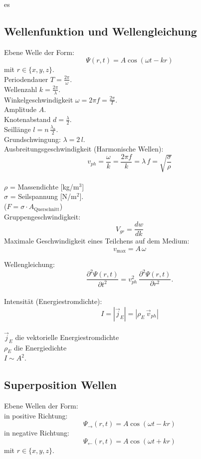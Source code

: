 es\documentclass[a4paper, fontsize=8pt, landscape]{scrartcl}
\begin{document}
\begin{multicols*}{4}
\subsection{Wellenfunktion und Wellengleichung}
    Ebene Welle der Form:
    \[\Psi(r,t) = A \cos(\omega t - k r)\]
    mit \(r \in \{x,y,z\}\).\\
    
    Periodendauer \(T = \frac{2\pi}{\omega}\).\\
    Wellenzahl \(k = \frac{2\pi}{\lambda}\).\\
    Winkelgeschwindigkeit \(\omega = 2\pi f = \frac{2\pi}{T}\).\\
    Amplitude \(A\).\\
    Knotenabstand \(d = \frac{\lambda}{2}\).\\
    Seillänge \(l = n\,\frac{\lambda_n}{2}\).\\
    Grundschwingung: \(\lambda = 2\,l\).\\



    Ausbreitungsgeschwindigkeit (Harmonische Wellen):
    \[v_{ph} =  \frac{\omega}{k} = \frac{2\pi f}{k} = \lambda\,f = \sqrt{\frac{\sigma}{\rho}}\]\\
    \(\rho\) = Massendichte [kg/m\(^3\)]\\
    \(\sigma\) = Seilspannung [N/m\(^2\)].\\
    ($F = \sigma \cdot A_{\text{Querschnitt}}$)\\
    Gruppengeschwindigkeit:
    \[V_{gr} = \frac{dw}{dk}\]
    Maximale Geschwindigkeit eines Teilchens auf dem Medium:
    \[v_{\text{max}} = A\,\omega\]


    Wellengleichung:
    \[\frac{\partial^2 \Psi(r,t)}{\partial t^2} = v_{ph}^2 \,\frac{\partial^2 \Psi(r,t)}{\partial r^2}.\]
    \\
    Intensität (Energiestromdichte):
    \[I = |\vec j_E| = |\rho_E\,\vec v_{ph}|\]\\
    \(\vec j_E\) die vektorielle Energiestromdichte\\
    \(\rho_E\) die Energiedichte\\
    \(I \sim A^2\).\\



\subsection{Superposition Wellen}
    Ebene Wellen der Form:\\
    in positive Richtung:
    \[\Psi_{\rightarrow}(r,t) = A \cos(\omega t - k r)\] 
    in negative Richtung:
    \[\Psi_{\leftarrow}(r,t) = A \cos(\omega t + k r)\] 
    mit \(r \in \{x,y,z\}\).\\


\end{multicols*}
\end{document}
